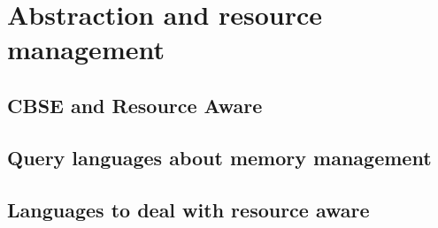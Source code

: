 \chapter{Abstraction and resource management}
\label{chap:abstractions_and_resource_management}


\section{CBSE and Resource Aware}

\section{Query languages about memory management}

\section{Languages to deal with resource aware}
